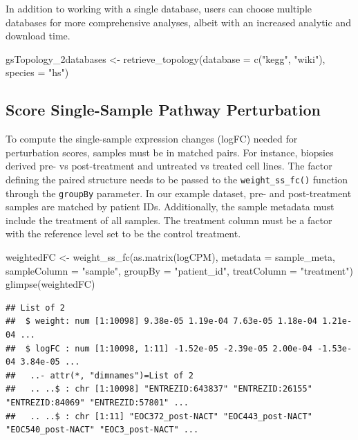 \documentclass[9pt,a4paper,]{extarticle}
\newenvironment{Shaded}{\begin{snugshade}}{\end{snugshade}}
\newcommand{\AttributeTok}[1]{\textcolor[rgb]{0.77,0.63,0.00}{#1}}
\newcommand{\FunctionTok}[1]{\textcolor[rgb]{0.00,0.00,0.00}{#1}}
\newcommand{\NormalTok}[1]{#1}
\newcommand{\OtherTok}[1]{\textcolor[rgb]{0.56,0.35,0.01}{#1}}
\newcommand{\StringTok}[1]{\textcolor[rgb]{0.31,0.60,0.02}{#1}}
\begin{document}
In addition to working with a single database, users can choose multiple databases for more comprehensive analyses, albeit with an increased analytic and download time.

\begin{Shaded}
\begin{Highlighting}[]
\NormalTok{gsTopology\_2databases }\OtherTok{\textless{}{-}} \FunctionTok{retrieve\_topology}\NormalTok{(}\AttributeTok{database =} \FunctionTok{c}\NormalTok{(}\StringTok{"kegg"}\NormalTok{, }\StringTok{"wiki"}\NormalTok{), }
                                           \AttributeTok{species =} \StringTok{"hs"}\NormalTok{)}
\end{Highlighting}
\end{Shaded}

\hypertarget{score-single-sample-pathway-perturbation}{%
\subsection{Score Single-Sample Pathway Perturbation}\label{score-single-sample-pathway-perturbation}}

To compute the single-sample expression changes (logFC) needed for perturbation scores, samples must be in matched pairs.
For instance, biopsies derived pre- vs post-treatment and untreated vs treated cell lines.
The factor defining the paired structure needs to be passed to the \texttt{weight\_ss\_fc()} function through the \texttt{groupBy} parameter.
In our example dataset, pre- and post-treatment samples are matched by patient IDs.
Additionally, the sample metadata must include the treatment of all samples. The treatment column must be a factor with the reference level set to be the control treatment.

\begin{Shaded}
\begin{Highlighting}[]
\NormalTok{weightedFC }\OtherTok{\textless{}{-}} \FunctionTok{weight\_ss\_fc}\NormalTok{(}\FunctionTok{as.matrix}\NormalTok{(logCPM), }\AttributeTok{metadata =}\NormalTok{ sample\_meta,}
 \AttributeTok{sampleColumn =} \StringTok{"sample"}\NormalTok{, }\AttributeTok{groupBy =} \StringTok{"patient\_id"}\NormalTok{, }\AttributeTok{treatColumn =} \StringTok{"treatment"}\NormalTok{)}
\FunctionTok{glimpse}\NormalTok{(weightedFC)}
\end{Highlighting}
\end{Shaded}

\begin{verbatim}
## List of 2
##  $ weight: num [1:10098] 9.38e-05 1.19e-04 7.63e-05 1.18e-04 1.21e-04 ...
##  $ logFC : num [1:10098, 1:11] -1.52e-05 -2.39e-05 2.00e-04 -1.53e-04 3.84e-05 ...
##   ..- attr(*, "dimnames")=List of 2
##   .. ..$ : chr [1:10098] "ENTREZID:643837" "ENTREZID:26155" "ENTREZID:84069" "ENTREZID:57801" ...
##   .. ..$ : chr [1:11] "EOC372_post-NACT" "EOC443_post-NACT" "EOC540_post-NACT" "EOC3_post-NACT" ...
\end{verbatim}
\end{document}
